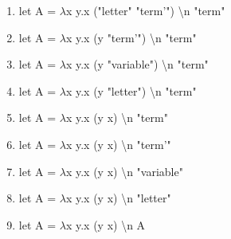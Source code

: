 \documentclass{article}
\begin{document}
\begin{enumerate}
    \item let A = $\lambda$x y.x ("letter" "term'") \textbackslash n "term"
    \item let A = $\lambda$x y.x (y "term'") \textbackslash n "term"
    \item let A = $\lambda$x y.x (y "variable") \textbackslash n "term"
    \item let A = $\lambda$x y.x (y "letter") \textbackslash n "term"
    \item let A = $\lambda$x y.x (y x) \textbackslash n "term"
    \item let A = $\lambda$x y.x (y x) \textbackslash n "term'"
    \item let A = $\lambda$x y.x (y x) \textbackslash n "variable"
    \item let A = $\lambda$x y.x (y x) \textbackslash n "letter"
    \item let A = $\lambda$x y.x (y x) \textbackslash n A
\end{enumerate}
\end{document}
